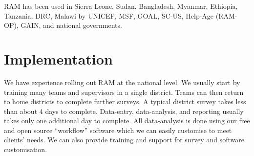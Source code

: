 \documentclass[12pt,a4paper]{article}
\begin{document}
RAM has been used in Sierra Leone, Sudan, Bangladesh, Myanmar, Ethiopia, Tanzania, DRC, Malawi by UNICEF, MSF, GOAL, SC-US, Help-Age (RAM-OP), GAIN, and national governments.

\hypertarget{implementation}{%
\section{Implementation}\label{implementation}}

We have experience rolling out RAM at the national level. We usually start by training many teams and supervisors in a single district. Teams can then return to home districts to complete further surveys. A typical district survey takes less than about 4 days to complete. Data-entry, data-analysis, and reporting usually takes only one additional day to complete. All data-analysis is done using our free and open source ``workflow'' software which we can easily customise to meet clients' needs. We can also provide training and support for survey and software customisation.


\end{document}
